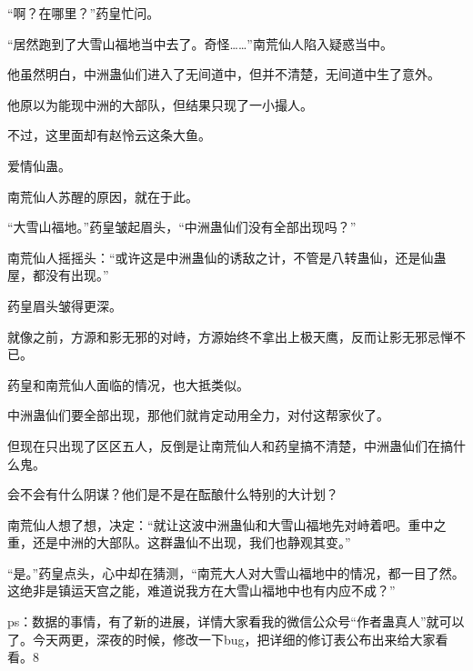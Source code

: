 \begin{this_body}
“啊？在哪里？”药皇忙问。

“居然跑到了大雪山福地当中去了。奇怪……”南荒仙人陷入疑惑当中。

他虽然明白，中洲蛊仙们进入了无间道中，但并不清楚，无间道中生了意外。

他原以为能现中洲的大部队，但结果只现了一小撮人。

不过，这里面却有赵怜云这条大鱼。

爱情仙蛊。

南荒仙人苏醒的原因，就在于此。

“大雪山福地。”药皇皱起眉头，“中洲蛊仙们没有全部出现吗？”

南荒仙人摇摇头：“或许这是中洲蛊仙的诱敌之计，不管是八转蛊仙，还是仙蛊屋，都没有出现。”

药皇眉头皱得更深。

就像之前，方源和影无邪的对峙，方源始终不拿出上极天鹰，反而让影无邪忌惮不已。

药皇和南荒仙人面临的情况，也大抵类似。

中洲蛊仙们要全部出现，那他们就肯定动用全力，对付这帮家伙了。

但现在只出现了区区五人，反倒是让南荒仙人和药皇搞不清楚，中洲蛊仙们在搞什么鬼。

会不会有什么阴谋？他们是不是在酝酿什么特别的大计划？

南荒仙人想了想，决定：“就让这波中洲蛊仙和大雪山福地先对峙着吧。重中之重，还是中洲的大部队。这群蛊仙不出现，我们也静观其变。”

“是。”药皇点头，心中却在猜测，“南荒大人对大雪山福地中的情况，都一目了然。这绝非是镇运天宫之能，难道说我方在大雪山福地中也有内应不成？”

ps：数据的事情，有了新的进展，详情大家看我的微信公众号“作者蛊真人”就可以了。今天两更，深夜的时候，修改一下bug，把详细的修订表公布出来给大家看看。8

\end{this_body}

